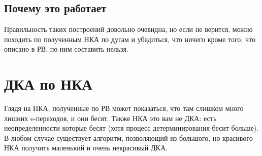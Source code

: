 \documentclass[14pt]{extreport}
\begin{document}
	\section{Почему это работает}
	Правильность таких построений довольно очевидна, но если не верится, можно походить по
	полученным НКА по дугам и убедиться, что ничего кроме того, что описано в РВ, по ним
	составить нельзя.
	\newpage
	
	\chapter{ДКА по НКА}
	Глядя на НКА, полученные по РВ может показаться, что там слишком много лишних e-переходов,
	и они бесят. Также НКА это вам не ДКА: есть неопределенности которые бесят (хотя процесс
	детерминирования бесит больше). В любом случае существует алгоритм, позволяющий из большого,
	но красивого НКА получить маленький и очень некрасивый ДКА.
\end{document}
